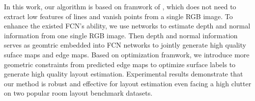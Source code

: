 In this work, our algorithm is based on framwork of \cite{dasgupta2016delay}, which does not need to extract low features of lines and vanish points from a single RGB image. To enhance the existed FCN's ability, we use networks to estimate depth and normal information from one single RGB image. Then depth and normal information serves as geomtric embedded into FCN networks to jointly generate high quality suface maps and edge maps. Based on\cite{dasgupta2016delay} optimization framwork, we introduce more geometric constraints from predicted edge maps to optimize surface labels to generate high quality layout estimation. Experimental results demonstrate that our method is robust and effective for layout estimation even facing a high clutter on two popular room layout benchmark datasets.
 
 




	
	

